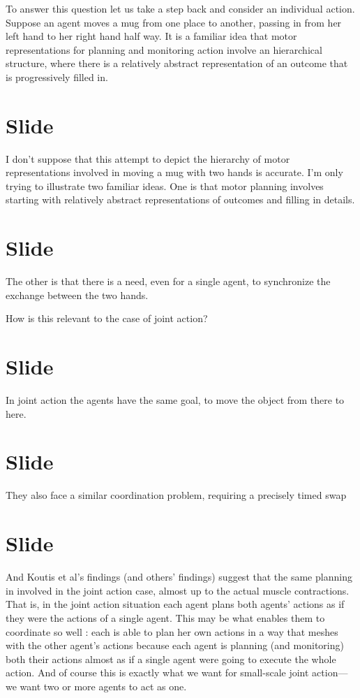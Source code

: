 \documentclass[12pt,\papersize]{extarticle}
\begin{document}
To answer this question
let us take a step back and consider an individual action.
Suppose an agent moves a mug from one place to another, passing in from her left hand to her right hand half way.
It is a familiar idea that motor representations for planning and monitoring action involve an hierarchical structure,
where there is a relatively abstract representation of an outcome that is progressively filled in.




\section{Slide}
I don’t suppose that this attempt to depict the hierarchy of motor representations involved in moving a mug with two hands is accurate.
I’m only trying to illustrate two familiar ideas.
One is that motor planning involves starting with relatively abstract representations of outcomes and filling in details.




\section{Slide}
The other is that there is a need, even for a single agent, to synchronize the exchange between the two hands.

How is this relevant to the case of joint action?



\section{Slide}
In joint action the agents have the same goal, to move the object from there to here.



\section{Slide}
They also face a similar coordination problem, requiring a precisely timed swap



\section{Slide}
And Koutis et al’s findings (and others’ findings) suggest that the same planning in involved in the joint action case, almost up to the actual muscle contractions.
That is, in the joint action situation each agent plans both agents’ actions as if they were the actions of a single agent.
This may be what enables them to coordinate so well : each is able to plan her own actions in a way that meshes with the other agent’s actions because each agent is planning (and monitoring) both their actions almost as if a single agent were going to execute the whole action.
And of course this is exactly what we want for small-scale joint action---we want two or more agents to act as one.
\end{document}
